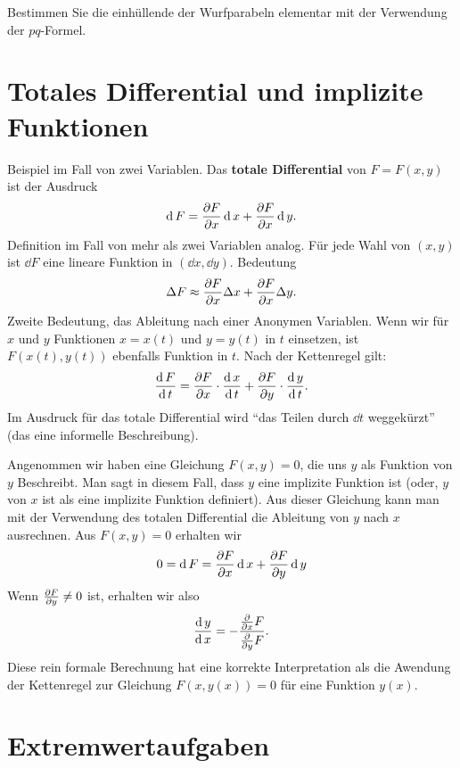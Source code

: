 \begin{aufg}
	Bestimmen Sie die einhüllende der Wurfparabeln elementar mit der Verwendung der $pq$-Formel. %
\end{aufg} 

\section{Totales Differential und implizite Funktionen} 

\begin{bem} 
	Beispiel im Fall von zwei Variablen. Das \textbf{totale Differential} von $F = F(x,y)$ ist der Ausdruck 
	\[
		\operatorname{d} F = \frac{\partial F}{\partial x} \operatorname{d} x + \frac{\partial F}{\partial x} \operatorname{d} y. 
	\]
	Definition im Fall von mehr als zwei Variablen analog. Für jede Wahl von $(x,y)$ ist $\dd F$ eine lineare Funktion in $(\dd x, \dd y)$. Bedeutung 
	\[
		\Delta F \approx \frac{\partial F}{\partial x} \Delta x + \frac{\partial F}{\partial x} \Delta y. 
	\]
	Zweite Bedeutung, das Ableitung nach einer Anonymen Variablen. Wenn wir für $x$ und $y$ Funktionen $x=x(t)$ und $y=y(t)$ in $t$ einsetzen, ist $F(x(t),y(t))$ ebenfalls Funktion in $t$. Nach der Kettenregel gilt: 
	\begin{align*}
		\frac{ \operatorname{d} F }{\operatorname{d} t} = \frac{\partial F}{\partial x} \cdot \frac{\operatorname{d} x}{\operatorname{d} t} + \frac{\partial F}{\partial y} \cdot \frac{\operatorname{d} y}{\operatorname{d} t}. 
	\end{align*} 
	Im Ausdruck für das totale Differential wird ``das Teilen durch $\dd t$ weggekürzt'' (das eine informelle Beschreibung). 
\end{bem} 

\begin{bem}
	Angenommen wir haben eine Gleichung $F(x,y) = 0$, die uns $y$ als Funktion von $y$ Beschreibt. Man sagt in diesem Fall, dass $y$ eine implizite Funktion ist (oder, $y$ von $x$ ist als eine implizite Funktion definiert). Aus dieser Gleichung kann man mit der Verwendung des totalen Differential die Ableitung von $y$ nach $x$ ausrechnen. Aus $F(x,y) = 0$ erhalten wir 
	\[
		0 = \operatorname{d} F = \frac{\partial F}{\partial x} \operatorname{d} x + \frac{\partial F}{\partial y} \operatorname{d} y
	\]
	Wenn $\frac{\partial F}{\partial y} \ne 0$ ist, erhalten wir also 
	\[
		\frac{\operatorname{d} y}{\operatorname{d} x} =  - \frac{\frac{\partial }{\partial x} F}{\frac{\partial }{\partial y} F}.
	\]
	Diese rein formale Berechnung hat eine korrekte Interpretation als die Awendung der Kettenregel zur Gleichung $F(x,y(x) ) = 0$ für eine Funktion $y(x)$. 
\end{bem} 

\section{Extremwertaufgaben}

